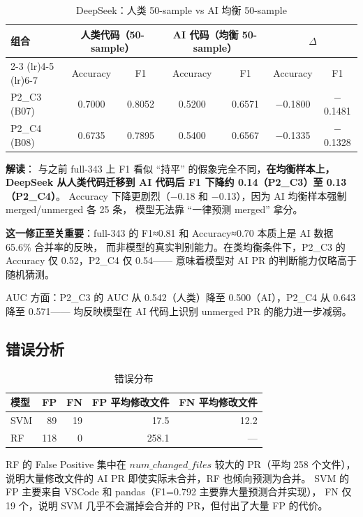 \documentclass{experimentreport}
\begin{document}
\begin{table}[htbp]
\centering
\caption{DeepSeek：人类 50-sample vs AI 均衡 50-sample}
\begin{tabular}{lcccccc}
\toprule
\multirow{2}{*}{组合} & \multicolumn{2}{c}{人类代码（50-sample）} & \multicolumn{2}{c}{AI 代码（均衡 50-sample）} & \multicolumn{2}{c}{$\Delta$} \\
\cmidrule(lr){2-3} \cmidrule(lr){4-5} \cmidrule(lr){6-7}
 & Accuracy & F1 & Accuracy & F1 & Accuracy & F1 \\
\midrule
P2\_C3 (B07) & 0.7000 & 0.8052 & 0.5200 & 0.6571 & $-$0.1800 & $-$0.1481 \\
P2\_C4 (B08) & 0.6735 & 0.7895 & 0.5400 & 0.6567 & $-$0.1335 & $-$0.1328 \\
\bottomrule
\end{tabular}
\end{table}

\textbf{解读}：
与之前 full-343 上 F1 看似 ``持平'' 的假象完全不同，\textbf{在均衡样本上，DeepSeek 从人类代码迁移到 AI 代码后 F1 下降约 0.14（P2\_C3）至 0.13（P2\_C4）}。
Accuracy 下降更剧烈（$-$0.18 和 $-$0.13），因为 AI 均衡样本强制 merged/unmerged 各 25 条，
模型无法靠 ``一律预测 merged'' 拿分。

\textbf{这一修正至关重要}：full-343 的 F1≈0.81 和 Accuracy≈0.70 本质上是 AI 数据 65.6\% 合并率的反映，
而非模型的真实判别能力。在类均衡条件下，P2\_C3 的 Accuracy 仅 0.52，P2\_C4 仅 0.54——
意味着模型对 AI PR 的判断能力仅略高于随机猜测。

AUC 方面：P2\_C3 的 AUC 从 0.542（人类）降至 0.500（AI），P2\_C4 从 0.643 降至 0.571——
均反映模型在 AI 代码上识别 unmerged PR 的能力进一步减弱。

\subsection{错误分析}

\begin{table}[htbp]
\centering
\caption{错误分布}
\begin{tabular}{lrrrr}
\toprule
模型 & FP & FN & FP 平均修改文件 & FN 平均修改文件 \\
\midrule
SVM & 89 & 19 & 17.5 & 12.2 \\
RF  & 118 & 0 & 258.1 & --- \\
\bottomrule
\end{tabular}
\end{table}

RF 的 False Positive 集中在 $num\_changed\_files$ 较大的 PR（平均 258 个文件），
说明大量修改文件的 AI PR 即使实际未合并，RF 也倾向预测为合并。
SVM 的 FP 主要来自 VSCode 和 pandas（F1=0.792 主要靠大量预测合并实现），
FN 仅 19 个，说明 SVM 几乎不会漏掉会合并的 PR，但付出了大量 FP 的代价。
\end{document}
